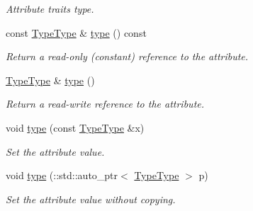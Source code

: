 \begin{DoxyCompactItemize}
\begin{DoxyCompactList}\small\item\em Attribute traits type. \item\end{DoxyCompactList}\item 
const \hyperlink{classopenstack_1_1xml_1_1RebootType}{TypeType} \& \hyperlink{classopenstack_1_1xml_1_1Reboot_afabde10a3adce6454566f0ecca0c58fa}{type} () const 
\begin{DoxyCompactList}\small\item\em Return a read-\/only (constant) reference to the attribute. \item\end{DoxyCompactList}\item 
\hyperlink{classopenstack_1_1xml_1_1RebootType}{TypeType} \& \hyperlink{classopenstack_1_1xml_1_1Reboot_ab39a2f5224376d01325c8cce41ee00f6}{type} ()
\begin{DoxyCompactList}\small\item\em Return a read-\/write reference to the attribute. \item\end{DoxyCompactList}\item 
void \hyperlink{classopenstack_1_1xml_1_1Reboot_a6a112e4f5be59969e3fe127968bbcb6f}{type} (const \hyperlink{classopenstack_1_1xml_1_1RebootType}{TypeType} \&x)
\begin{DoxyCompactList}\small\item\em Set the attribute value. \item\end{DoxyCompactList}\item 
void \hyperlink{classopenstack_1_1xml_1_1Reboot_aafc3ffb992b8bd28a62285c0567686d7}{type} (::std::auto\_\-ptr$<$ \hyperlink{classopenstack_1_1xml_1_1RebootType}{TypeType} $>$ p)
\begin{DoxyCompactList}\small\item\em Set the attribute value without copying. \item\end{DoxyCompactList}\end{DoxyCompactItemize}
